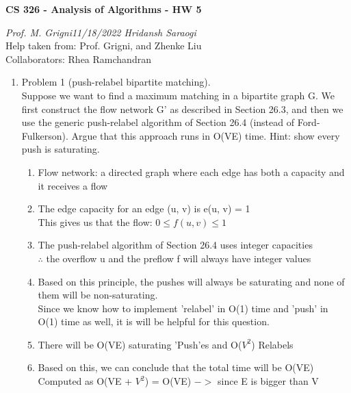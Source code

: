 \documentclass[11pt]{article}
\begin{document}
\begin{center}
    \textbf{CS 326 - Analysis of Algorithms - HW 5}\\
\end{center}


\begin{flushleft}
    \textit{Prof. M. Grigni\hfill11/18/2022 \hfill Hridansh Saraogi} \\
    \vspace{0.15cm}
    \small {Help taken from: Prof. Grigni, and Zhenke Liu}\\
    \small {Collaborators: Rhea Ramchandran}
\end{flushleft}


\begin{enumerate}

\item Problem 1 (push-relabel bipartite matching). \\
Suppose we want to find a maximum matching in a bipartite graph G. We first construct the flow network G' as described in Section 26.3, and then we use the generic push-relabel algorithm of Section 26.4 (instead of Ford-Fulkerson). Argue that this approach runs in O(VE) time.  Hint: show every push is saturating.
    \begin{enumerate}
        \item Flow network: a directed graph where each edge has both a capacity and it receives a flow
        \item The edge capacity for an edge (u, v) is e(u, v) = 1\\
        This gives us that the flow: $0 \leq f(u,v) \leq 1$
        \item The push-relabel algorithm of Section 26.4 uses integer capacities\\$\therefore$ the overflow u and the preflow f will always have integer values
        \item Based on this principle, the pushes will always be saturating and none of them will be non-saturating.\\
        Since we know how to implement 'relabel' in O(1) time and 'push' in O(1) time as well, it is will be helpful for this question.
        \item There will be O(VE) saturating 'Push'es and O($V^2$) Relabels
        \item Based on this, we can conclude that the total time will be O(VE)\\
        Computed as O(VE + $V^2$) = O(VE)  $->$ since E is bigger than V
    \end{enumerate}


\end{enumerate}
\end{document}
